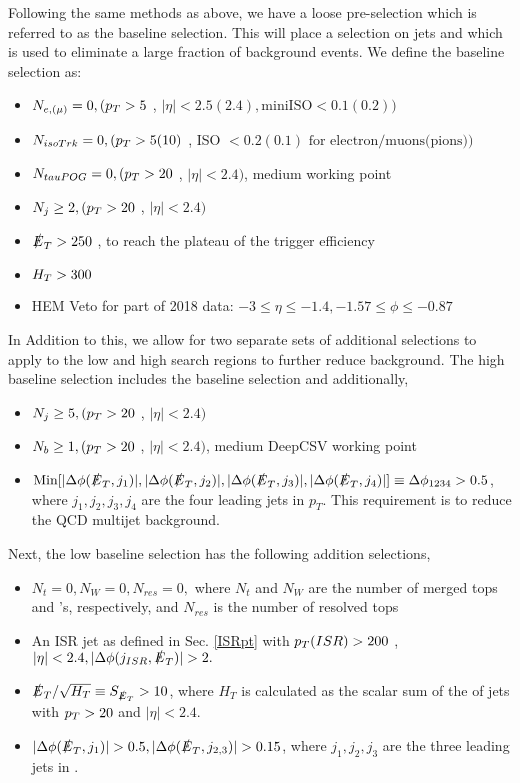 Following the same methods as above, we have a loose pre-selection which is referred to as the baseline selection. This will place a selection on jets and \met which is used to eliminate a large fraction of background events. We define the baseline selection as:
\begin{itemize}
	\item $N_{e,(\mu)} = 0, (p_{T}>5$ \GeV, $|\eta|<2.5(2.4), \text{miniISO}<0.1(0.2))$
	\item $N_{isoTrk} = 0, (p_{T} > 5 (10)$ \GeV, ISO $< 0.2(0.1) \text{ for electron/muons(pions)})$
	\item $N_{tauPOG} = 0, (p_{T} > 20$ \GeV, $|\eta|<2.4)$, medium working point
	\item $N_{j} \geq 2, (p_{T} >20$ \GeV, $|\eta|<2.4)$
	\item $\slashed{E}_{T} >250$ \GeV, to reach the plateau of the trigger efficiency
	\item $H_{T}>300$ \GeV
	\item HEM Veto for part of 2018 data: $-3\leq\eta\leq-1.4, -1.57\leq\phi\leq-0.87$
\end{itemize}
In Addition to this, we allow for two separate sets of additional selections to apply to the low and high \dm{} search regions to further reduce background. The high \dm{} baseline selection includes the baseline selection and additionally,
\begin{itemize}
	\item $N_j\geq 5, (p_{T} >20$ \GeV, $|\eta|<2.4)$
	\item $N_b\geq 1, (p_{T} >20$ \GeV, $|\eta|<2.4)$, medium DeepCSV working point
	\item $\text{Min}[|\Delta\phi(\slashed{E}_{T},j_1)|,|\Delta\phi(\slashed{E}_{T},j_2)|,|\Delta\phi(\slashed{E}_{T},j_3)|,|\Delta\phi(\slashed{E}_{T},j_4)|]\equiv\Delta\phi_{1234}>0.5$, where $j_1, j_2, j_3, j_4$ are the four leading jets in $p_T$. This requirement is to reduce the QCD multijet background. 
\end{itemize}
Next, the low \dm{} baseline selection has the following addition selections,
\begin{itemize}
	\item $N_t=0, N_W=0,N_{res}=0,$ where $N_t$ and $N_W$ are the number of merged tops and \W's, respectively, and $N_{res}$ is the number of resolved tops
	\item An ISR jet as defined in Sec. \ref{ISRpt} with $p_{T}(ISR)>200$ \GeV, $|\eta|<2.4, |\Delta\phi(j_{ISR},\met)|>2.$
	\item $\slashed{E}_{T}/\sqrt{H_{T}}\equiv S_{\slashed{E}_{T}}>10$, where $H_T$ is calculated as the scalar sum of the \pt of jets with $p_{T} >20$ \GeV{} and $|\eta|<2.4.$
	\item $|\Delta\phi(\met,j_1)|>0.5, |\Delta\phi(\met,j_{2,3})|>0.15$, where $j_1,j_2,j_3$ are the three leading jets in \pt. 
\end{itemize}

